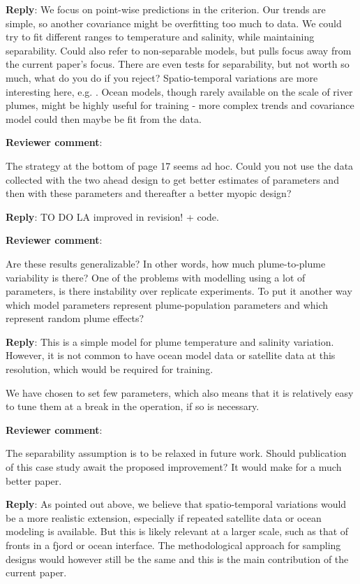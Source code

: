 \documentclass[a4paper]{article}
\def\revcom{\textbf{Reviewer comment}}
\def\reply{\textbf{Reply}}
\begin{document}
\begin{answers}
\reply: We focus on point-wise predictions in the criterion. Our trends are simple, so another covariance might be overfitting too much to data. We could try to fit different ranges to temperature and salinity, while maintaining separability. Could also refer to non-separable models, but pulls focus away from the current paper's focus. There are even tests for separability, but not worth so much, what do you do if you reject? Spatio-temporal variations are more interesting here, e.g. \cite{sigrist2015stochastic,richardson2017sparsity}. Ocean models, though rarely available on the scale of river plumes, might be highly useful for training - more complex trends and covariance model could then maybe be fit from the data. 

\item{\revcom  :}\label{r1c10}

The strategy at the bottom of page 17 seems ad hoc. Could you not use the data collected with the two ahead design to get better estimates of parameters and then with these parameters and thereafter a better myopic design?

\reply: TO DO LA improved in revision! + code. %

\item{\revcom :}\label{r1c11}

Are these results generalizable? In other words, how much plume-to-plume variability is there? One of the problems with modelling using a lot of parameters, is there instability over replicate experiments. To put it another way which model parameters represent plume-population parameters and which represent random plume effects?

\reply: This is a simple model for plume temperature and salinity variation. However, it is not common to have ocean model data or satellite data at this resolution, which would be required for training. 

We have chosen to set few parameters, which also means that it is relatively easy to tune them at a break in the operation, if so is necessary.


\item{\revcom :}\label{r1c12}

The separability assumption is to be relaxed in future work. Should publication of this case study await the proposed improvement? It would make for a much better paper.

\reply: As pointed out above, we believe that spatio-temporal variations would be a more realistic extension, especially if repeated satellite data or ocean modeling is available. But this is likely relevant at a larger scale, such as that of fronts in a fjord or ocean interface. The methodological approach for sampling designs would however still be the same and this is the main contribution of the current paper. 


\end{answers}
\end{document}
